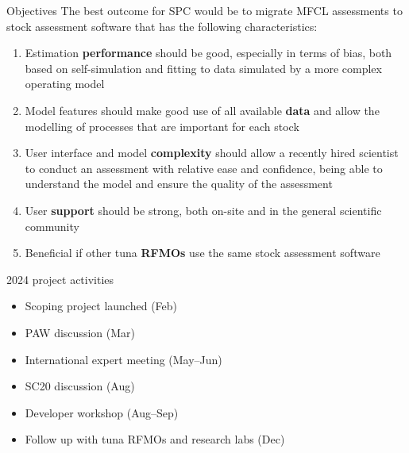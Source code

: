 \documentclass[aspectratio=169,fleqn]{beamer}
\begin{document}
\begin{frame}{Objectives}
  The best outcome for SPC would be to migrate MFCL assessments to stock
  assessment software that has the following characteristics:\\[1ex]
  \begin{enumerate}
    \renewcommand\theenumi{\alph{enumi}}
    \item Estimation {\bf\blue performance} should be good, especially in
    terms of bias, both based on self-simulation and fitting to data simulated
    by a more complex operating model\\[1.5ex]
    \item Model features should make good use of all available {\bf\blue data}
    and allow the modelling of processes that are important for each
    stock\\[1.5ex]
    \item User interface and model {\bf\blue complexity} should allow a recently
    hired scientist to conduct an assessment with relative ease and confidence,
    being able to understand the model and ensure the quality of the
    assessment\\[1.5ex]
    \item User {\bf\blue support} should be strong, both on-site and in the
    general scientific community\\[1.5ex]
    \item Beneficial if other tuna {\bf\blue RFMOs} use the same stock
    assessment software\\[3ex]
  \end{enumerate}
\end{frame}


\begin{frame}{2024 project activities}
  \begin{itemize}
    \item[] Scoping project launched (Feb)\\[3ex]
    \item[] PAW discussion (Mar)\\[3ex]
    \item[] International expert meeting (May--Jun)\\[3ex]
    \item[] SC20 discussion (Aug)\\[3ex]
    \item[] Developer workshop (Aug--Sep)\\[3ex]
    \item[] Follow up with tuna RFMOs and research labs (Dec)\\[2ex]
  \end{itemize}
\end{frame}
\end{document}

